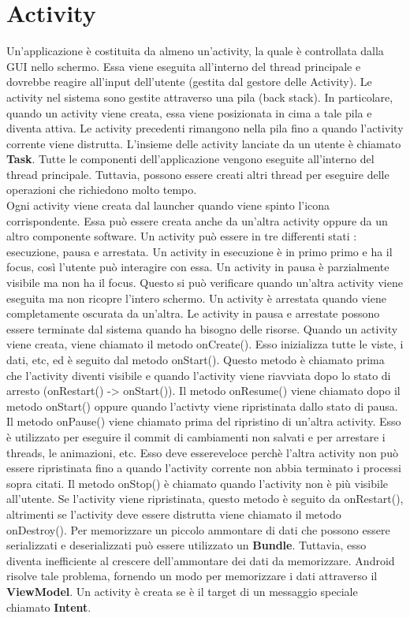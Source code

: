 \documentclass[12pt]{report}
\begin{document}
\section{Activity}
Un'applicazione è costituita da almeno un'activity, la quale è controllata dalla GUI nello schermo. Essa viene eseguita all'interno del thread principale e dovrebbe reagire all'input dell'utente (gestita dal gestore delle Activity). Le activity nel sistema sono gestite attraverso una pila (back stack). In particolare, quando un activity viene creata, essa viene posizionata in cima a tale pila e diventa attiva. Le activity precedenti rimangono nella pila fino a quando l'activity corrente viene distrutta. L'insieme delle activity lanciate da un utente è chiamato \textbf{Task}. Tutte le componenti dell'applicazione vengono eseguite all'interno del thread principale. Tuttavia, possono essere creati altri thread per eseguire delle operazioni che richiedono molto tempo. \\Ogni activity viene creata dal launcher quando viene spinto l'icona corrispondente. Essa può essere creata anche da un'altra activity oppure da un altro componente software. Un activity può essere in tre differenti stati : esecuzione, pausa e arrestata. Un activity in esecuzione è in primo primo e ha il focus, così l'utente può interagire con essa. Un activity in pausa è parzialmente visibile ma non ha il focus. Questo si può verificare quando un'altra activity viene eseguita ma non ricopre l'intero schermo. Un activity è arrestata quando viene completamente oscurata da un'altra. Le activity in pausa e arrestate possono essere terminate dal sistema quando ha bisogno delle risorse. Quando un activity viene creata, viene chiamato il metodo onCreate(). Esso inizializza tutte le viste, i dati, etc, ed è seguito dal metodo onStart(). Questo metodo è chiamato prima che l'activity diventi visibile e quando l'activity viene riavviata dopo lo stato di arresto (onRestart() -> onStart()). Il metodo onResume() viene chiamato dopo il metodo onStart() oppure quando l'activty viene ripristinata dallo stato di pausa. Il metodo onPause() viene chiamato prima del ripristino di un'altra activity. Esso è utilizzato per eseguire il commit di cambiamenti non salvati e per arrestare i threads, le animazioni, etc. Esso deve essereveloce perchè l'altra activity non può essere ripristinata fino a quando l'activity corrente non abbia terminato i processi sopra citati. Il metodo onStop() è chiamato quando l'activity non è più visibile all'utente. Se l'activity viene ripristinata, questo metodo è seguito da onRestart(), altrimenti se l'activity deve essere distrutta viene chiamato il metodo onDestroy(). Per memorizzare un piccolo ammontare di dati che possono essere serializzati e deserializzati può essere utilizzato un \textbf{Bundle}. Tuttavia, esso diventa inefficiente al crescere dell'ammontare dei dati da memorizzare. Android risolve tale problema, fornendo un modo per memorizzare i dati attraverso il \textbf{ViewModel}. Un activity è creata se è il target di un messaggio speciale chiamato \textbf{Intent}.
\end{document}
